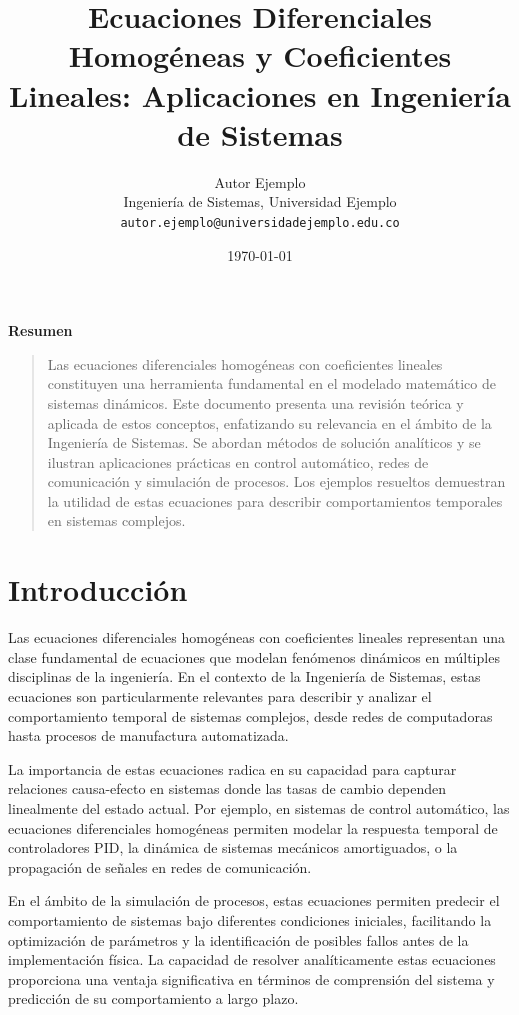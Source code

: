 \documentclass[12pt]{article}
\title{
    \vspace{2cm}
    \Large\textbf{Ecuaciones Diferenciales Homogéneas y Coeficientes Lineales: Aplicaciones en Ingeniería de Sistemas}
    \vspace{1cm}
}
\author{
    Autor Ejemplo \\
    Ingeniería de Sistemas, Universidad Ejemplo \\
    \texttt{autor.ejemplo@universidadejemplo.edu.co}
}
\date{\today}
\begin{document}
\maketitle
\thispagestyle{empty}
\vfill
\begin{center}
    \textbf{Resumen}
\end{center}
\begin{quote}
    Las ecuaciones diferenciales homogéneas con coeficientes lineales constituyen una herramienta fundamental en el modelado matemático de sistemas dinámicos. Este documento presenta una revisión teórica y aplicada de estos conceptos, enfatizando su relevancia en el ámbito de la Ingeniería de Sistemas. Se abordan métodos de solución analíticos y se ilustran aplicaciones prácticas en control automático, redes de comunicación y simulación de procesos. Los ejemplos resueltos demuestran la utilidad de estas ecuaciones para describir comportamientos temporales en sistemas complejos.
\end{quote}
\newpage

\section{Introducción}

Las ecuaciones diferenciales homogéneas con coeficientes lineales representan una clase fundamental de ecuaciones que modelan fenómenos dinámicos en múltiples disciplinas de la ingeniería. En el contexto de la Ingeniería de Sistemas, estas ecuaciones son particularmente relevantes para describir y analizar el comportamiento temporal de sistemas complejos, desde redes de computadoras hasta procesos de manufactura automatizada.

La importancia de estas ecuaciones radica en su capacidad para capturar relaciones causa-efecto en sistemas donde las tasas de cambio dependen linealmente del estado actual. Por ejemplo, en sistemas de control automático, las ecuaciones diferenciales homogéneas permiten modelar la respuesta temporal de controladores PID, la dinámica de sistemas mecánicos amortiguados, o la propagación de señales en redes de comunicación.

En el ámbito de la simulación de procesos, estas ecuaciones permiten predecir el comportamiento de sistemas bajo diferentes condiciones iniciales, facilitando la optimización de parámetros y la identificación de posibles fallos antes de la implementación física. La capacidad de resolver analíticamente estas ecuaciones proporciona una ventaja significativa en términos de comprensión del sistema y predicción de su comportamiento a largo plazo.
\end{document}
